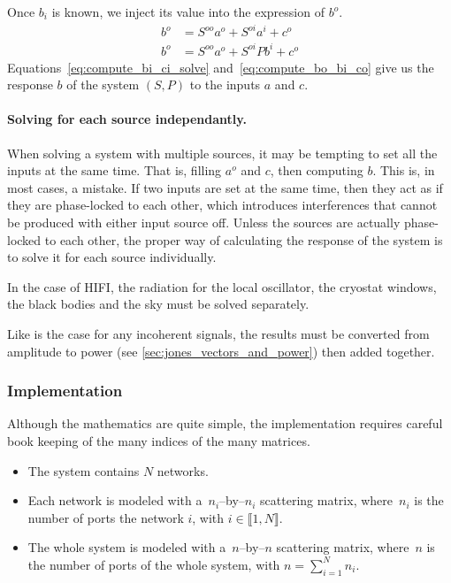 Once $b_i$ is known, we inject its value into the expression of $b^o$.
\begin{subequations}
    \begin{align}
        b^o &= S^{oo} a^o + S^{oi} a^i + c^o \label{eq:compute_bo_ai_co}\\
        b^o &= S^{oo} a^o + S^{oi} Pb^i + c^o \label{eq:compute_bo_bi_co}
    \end{align}
    \label{eq:compute_bo_co}
\end{subequations}
Equations~\eqref{eq:compute_bi_ci_solve} and~\eqref{eq:compute_bo_bi_co} give us the response $b$ of the system $(S, P)$ to the inputs $a$ and $c$.


\paragraph{Solving for each source independantly.}
\label{solving_for_each_source_independantly}
When solving a system with multiple sources, it may be tempting to set all the inputs at the same time.
That is, filling $a^o$ and $c$, then computing $b$.
This is, in most cases, a mistake.
If two inputs are set at the same time, then they act as if they are phase-locked to each other, which introduces interferences that cannot be produced with either input source off.
Unless the sources are actually phase-locked to each other, the proper way of calculating the response of the system is to solve it for each source individually.

In the case of HIFI, the radiation for the local oscillator, the cryostat windows, the black bodies and the sky must be solved separately.

Like is the case for any incoherent signals,
the results must be converted from amplitude to power (see \cref{sec:jones_vectors_and_power})
then added together.


\subsubsection{Implementation}
Although the mathematics are quite simple, the implementation requires careful book keeping of the many indices of the many matrices.

\begin{itemize}
    \item 
The system contains $N$ networks.
    \item 
Each network is modeled with a~$n_i$--by--$n_i$ scattering matrix, where~$n_i$ is the number of ports the network $i$, with $i \in \llbracket 1, N \rrbracket$.
    \item 
The whole system is modeled with a~$n$--by--$n$ scattering matrix, where~$n$ is the number of ports of the whole system, with $n = \sum_{i=1}^N n_i$.
\end{itemize}

